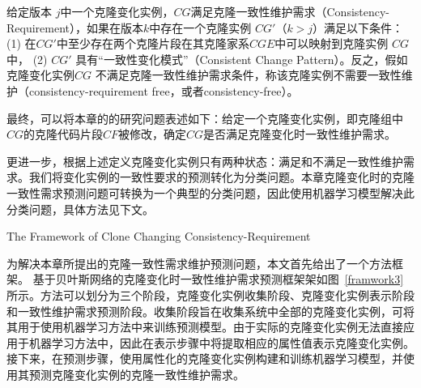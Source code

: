 \begin{definition}
 \label{def-changingrequirement}
给定版本 $j$中一个克隆变化实例，$CG$满足克隆一致性维护需求（Consistency-Requirement），如果在版本$k$中存在一个克隆实例 $CG'$（$k>j$）满足以下条件： (1) 在$CG'$中至少存在两个克隆片段在其克隆家系$CGE$中可以映射到克隆实例 $CG$中， (2) $CG'$ 具有“一致性变化模式”（Consistent Change Pattern）。反之，假如克隆变化实例$CG$ 不满足克隆一致性维护需求条件，称该克隆实例不需要一致性维护（consistency-requirement free，或者consistency-free）。
\end{definition}


最终，可以将本章的的研究问题表述如下：给定一个克隆变化实例，即克隆组中$CG$的克隆代码片段$CF$被修改，确定$CG $是否满足克隆变化时一致性维护需求。

更进一步，根据上述定义克隆变化实例只有两种状态：满足和不满足一致性维护需求。我们将变化实例的一致性要求的预测转化为分类问题。本章克隆变化时的克隆一致性需求预测问题可转换为一个典型的分类问题，因此使用机器学习模型解决此分类问题，具体方法见下文。

{The Framework of Clone Changing Consistency-Requirement}

为解决本章所提出的克隆一致性需求维护预测问题，本文首先给出了一个方法框架。
基于贝叶斯网络的克隆变化时一致性维护需求预测框架架如图~\ref{framwork3}所示。方法可以划分为三个阶段，克隆变化实例收集阶段、克隆变化实例表示阶段和一致性维护需求预测阶段。收集阶段旨在收集系统中全部的克隆变化实例，可将其用于使用机器学习方法中来训练预测模型。由于实际的克隆变化实例无法直接应用于机器学习方法中，因此在表示步骤中将提取相应的属性值表示克隆变化实例。接下来，在预测步骤，使用属性化的克隆变化实例构建和训练机器学习模型，并使用其预测克隆变化实例的克隆一致性维护需求。

